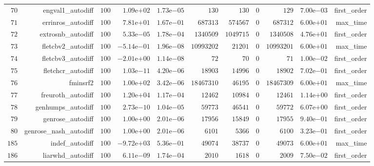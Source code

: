 \documentclass[varwidth=20cm,crop=true]{standalone}
\begin{document}
\begin{longtable}{rrrrrrrrrrr}
  \(    70\) & engval1\_autodiff & \(   100\) & \( 1.09\)e\(+02\) & \( 1.73\)e\(-05\) & \(   130\) & \(   130\) & \(     0\) & \(   129\) & \( 7.00\)e\(-03\) & first\_order \\
  \(    71\) & errinros\_autodiff & \(   100\) & \( 7.81\)e\(+01\) & \( 1.67\)e\(-01\) & \(687313\) & \(574567\) & \(     0\) & \(687312\) & \( 6.00\)e\(+01\) & max\_time \\
  \(    72\) & extrosnb\_autodiff & \(   100\) & \( 5.33\)e\(-05\) & \( 1.78\)e\(-04\) & \(1340509\) & \(1049715\) & \(     0\) & \(1340508\) & \( 4.76\)e\(+01\) & first\_order \\
  \(    73\) & fletcbv2\_autodiff & \(   100\) & \(-5.14\)e\(-01\) & \( 1.96\)e\(-08\) & \(10993202\) & \( 21201\) & \(     0\) & \(10993201\) & \( 6.00\)e\(+01\) & max\_time \\
  \(    74\) & fletcbv3\_autodiff & \(   100\) & \(-2.01\)e\(+00\) & \( 1.14\)e\(-08\) & \(    72\) & \(    70\) & \(     0\) & \(    71\) & \( 1.00\)e\(-02\) & first\_order \\
  \(    75\) & fletchcr\_autodiff & \(   100\) & \( 1.03\)e\(-11\) & \( 4.20\)e\(-06\) & \( 18903\) & \( 14996\) & \(     0\) & \( 18902\) & \( 7.02\)e\(-01\) & first\_order \\
  \(    76\) & fminsrf2 & \(   100\) & \( 1.00\)e\(+02\) & \( 3.42\)e\(-06\) & \(18467310\) & \( 46195\) & \(     0\) & \(18467309\) & \( 6.00\)e\(+01\) & max\_time \\
  \(    77\) & freuroth\_autodiff & \(   100\) & \( 1.20\)e\(+04\) & \( 1.17\)e\(-04\) & \( 12462\) & \( 10984\) & \(     0\) & \( 12461\) & \( 1.14\)e\(+00\) & first\_order \\
  \(    78\) & genhumps\_autodiff & \(   100\) & \( 2.73\)e\(-10\) & \( 1.04\)e\(-05\) & \( 59773\) & \( 46541\) & \(     0\) & \( 59772\) & \( 6.07\)e\(+00\) & first\_order \\
  \(    79\) & genrose\_autodiff & \(   100\) & \( 1.00\)e\(+00\) & \( 2.01\)e\(-06\) & \( 17956\) & \( 15849\) & \(     0\) & \( 17955\) & \( 9.40\)e\(-01\) & first\_order \\
  \(    80\) & genrose\_nash\_autodiff & \(   100\) & \( 1.00\)e\(+00\) & \( 2.01\)e\(-06\) & \(  6101\) & \(  5366\) & \(     0\) & \(  6100\) & \( 3.23\)e\(-01\) & first\_order \\
  \(   185\) & indef\_autodiff & \(   100\) & \(-9.72\)e\(+03\) & \( 5.36\)e\(-01\) & \( 49074\) & \( 38737\) & \(     0\) & \( 49073\) & \( 6.00\)e\(+01\) & max\_time \\
  \(   186\) & liarwhd\_autodiff & \(   100\) & \( 6.11\)e\(-09\) & \( 1.74\)e\(-04\) & \(  2010\) & \(  1618\) & \(     0\) & \(  2009\) & \( 7.50\)e\(-02\) & first\_order \\

\end{longtable}
\end{document}
